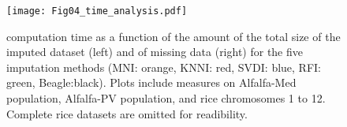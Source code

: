 \begin{figure}
\texttt{[image: Fig04\_time\_analysis.pdf]}
\caption[Computation times]{computation time as a function of the amount of the total size of the imputed dataset (left) and of missing data (right) for the five imputation methods (MNI: orange, KNNI: red, SVDI: blue, RFI: green, Beagle:black). Plots include measures on Alfalfa-Med population, Alfalfa-PV population, and rice chromosomes 1 to 12. Complete rice datasets are omitted for readibility.}
\label{fig:time_analysis}
\end{figure}
